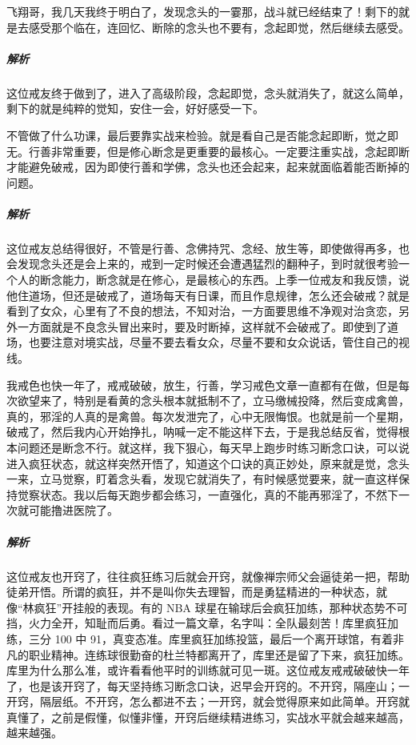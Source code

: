 \begin{case}[直接觉察消灭]
    飞翔哥，我几天我终于明白了，发现念头的一霎那，战斗就已经结束了！剩下的就是去感受那个临在，连回忆、断除的念头也不要有，念起即觉，然后继续去感受。
    \subparagraph{解析} 这位戒友终于做到了，进入了高级阶段，念起即觉，念头就消失了，就这么简单，剩下的就是纯粹的觉知，安住一会，好好感受一下。
\end{case}

\begin{case}[直接觉察消灭]
    不管做了什么功课，最后要靠实战来检验。就是看自己是否能念起即断，觉之即无。行善非常重要，但是修心断念是更重要的最核心。一定要注重实战，念起即断才能避免破戒，因为即使行善和学佛，念头也还会起来，起来就面临着能否断掉的问题。
    \subparagraph{解析} 这位戒友总结得很好，不管是行善、念佛持咒、念经、放生等，即使做得再多，也会发现念头还是会上来的，戒到一定时候还会遭遇猛烈的翻种子，到时就很考验一个人的断念能力，断念就是在修心，是最核心的东西。上季一位戒友和我反馈，说他住道场，但还是破戒了，道场每天有日课，而且作息规律，怎么还会破戒？就是看到了女众，心里有了不良的想法，不知对治，一方面要思维不净观对治贪恋，另外一方面就是不良念头冒出来时，要及时断掉，这样就不会破戒了。即使到了道场，也要注意对境实战，尽量不要去看女众，尽量不要和女众说话，管住自己的视线。
\end{case}

\begin{case}[直接觉察消灭]
    我戒色也快一年了，戒戒破破，放生，行善，学习戒色文章一直都有在做，但是每次欲望来了，特别是看黄的念头根本就抵制不了，立马缴械投降，然后变成禽兽，真的，邪淫的人真的是禽兽。每次发泄完了，心中无限悔恨。也就是前一个星期，破戒了，然后我内心开始挣扎，呐喊一定不能这样下去，于是我总结反省，觉得根本问题还是断念不行。就这样，我下狠心，每天早上跑步时练习断念口诀，可以说进入疯狂状态，就这样突然开悟了，知道这个口诀的真正妙处，原来就是觉，念头一来，立马觉察，盯着念头看，发现它就消失了，有时候感觉要来，就一直这样保持觉察状态。我以后每天跑步都会练习，一直强化，真的不能再邪淫了，不然下一次就可能撸进医院了。
    \subparagraph{解析} 这位戒友也开窍了，往往疯狂练习后就会开窍，就像禅宗师父会逼徒弟一把，帮助徒弟开悟。所谓的疯狂，并不是叫你失去理智，而是勇猛精进的一种状态，就像“林疯狂”开挂般的表现。有的 NBA 球星在输球后会疯狂加练，那种状态势不可挡，火力全开，知耻而后勇。看过一篇文章，名字叫：全队最刻苦！库里疯狂加练，三分 100 中 91，真变态准。库里疯狂加练投篮，最后一个离开球馆，有着非凡的职业精神。连练球很勤奋的杜兰特都离开了，库里还是留了下来，疯狂加练。库里为什么那么准，或许看看他平时的训练就可见一斑。这位戒友戒戒破破快一年了，也是该开窍了，每天坚持练习断念口诀，迟早会开窍的。不开窍，隔座山；一开窍，隔层纸。不开窍，怎么都进不去；一开窍，就会觉得原来如此简单。开窍就真懂了，之前是假懂，似懂非懂，开窍后继续精进练习，实战水平就会越来越高，越来越强。
\end{case}

